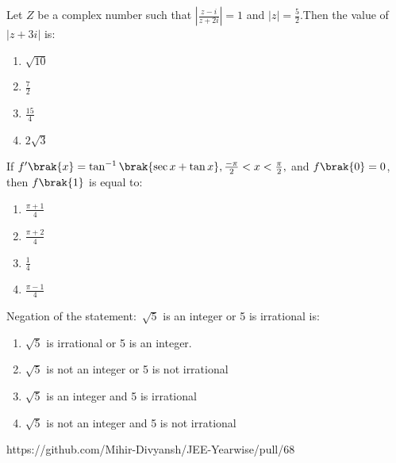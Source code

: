 \item Let $Z$ be a complex number such that $\left\lvert\frac{z-i}{z+2i}\right\rvert=1$ and $\lvert z \rvert=\frac{5}{2}$.Then the value of $\lvert z+3i\rvert$ is$\colon$ \hfill{}
\begin{enumerate}
    \item $\sqrt{10}$
    \item $\frac{7}{2}$
    \item $\frac{15}{4}$
    \item $2\sqrt{3}$
\end{enumerate}
\item If $f^{\prime}\brak{x}=\tan^{-1}\brak{\sec x + \tan x},\frac{-\pi}{2}<x<\frac{\pi}{2},$ and $f\brak{0}=0$, then $f\brak{1}$ is equal to$\colon$ \hfill{}
\begin{enumerate}
    \item $\frac{\pi+1}{4}$
    \item $\frac{\pi+2}{4}$
    \item $\frac{1}{4}$
    \item $\frac{\pi-1}{4}$
\end{enumerate}
\item Negation of the statement$\colon$ $\sqrt{5}$ is an integer or 5 is irrational is$\colon$ \hfill{}
\begin{enumerate}
    \item $\sqrt{5}$ is irrational or 5 is an integer.
    \item $\sqrt{5}$ is not an integer or 5 is not irrational
    \item $\sqrt{5}$ is an integer and 5 is irrational
    \item $\sqrt{5}$ is not an integer and 5 is not irrational
\end{enumerate}
https://github.com/Mihir-Divyansh/JEE-Yearwise/pull/68
